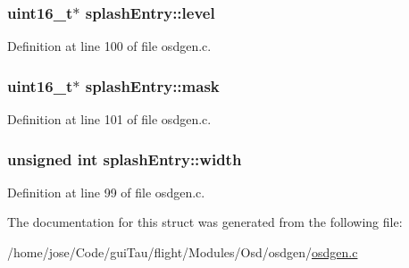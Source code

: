 \hypertarget{structsplash_entry_a6508f6926dabf69e7f04cec57e8f6d21}{
\subsubsection[{level}]{ {\bf uint16\-\_\-t}$\ast$ splash\-Entry\-::level}}\label{structsplash_entry_a6508f6926dabf69e7f04cec57e8f6d21}


Definition at line 100 of file osdgen.\-c.

\hypertarget{structsplash_entry_a0c3001285740dd3a0351be5565bf13d2}{
\subsubsection[{mask}]{ {\bf uint16\-\_\-t}$\ast$ splash\-Entry\-::mask}}\label{structsplash_entry_a0c3001285740dd3a0351be5565bf13d2}


Definition at line 101 of file osdgen.\-c.

\hypertarget{structsplash_entry_abc2b28627fe7b0fc9344188df68bb455}{
\subsubsection[{width}]{\setlength{\rightskip}{0pt plus 5cm}unsigned int splash\-Entry\-::width}}\label{structsplash_entry_abc2b28627fe7b0fc9344188df68bb455}


Definition at line 99 of file osdgen.\-c.



The documentation for this struct was generated from the following file\-:\begin{DoxyCompactItemize}
\item 
/home/jose/\-Code/gui\-Tau/flight/\-Modules/\-Osd/osdgen/\hyperlink{osdgen_8c}{osdgen.\-c}\end{DoxyCompactItemize}
